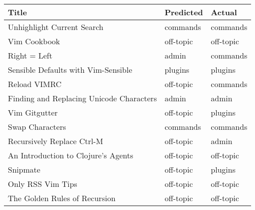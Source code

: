 \begin{tabular}{lll}
\hline
 Title                                    & Predicted   & Actual    \\
\hline
 Unhighlight Current Search               & commands    & commands  \\
 Vim Cookbook                             & off-topic   & off-topic \\
 Right = Left                             & admin       & commands  \\
 Sensible Defaults with Vim-Sensible      & plugins     & plugins   \\
 Reload VIMRC                             & off-topic   & commands  \\
 Finding and Replacing Unicode Characters & admin       & admin     \\
 Vim Gitgutter                            & off-topic   & plugins   \\
 Swap Characters                          & commands    & commands  \\
 Recursively Replace Ctrl-M               & off-topic   & admin     \\
 An Introduction to Clojure's Agents      & off-topic   & off-topic \\
 Snipmate                                 & off-topic   & plugins   \\
 Only RSS Vim Tips                        & off-topic   & off-topic \\
 The Golden Rules of Recursion            & off-topic   & off-topic \\
\hline
\end{tabular}